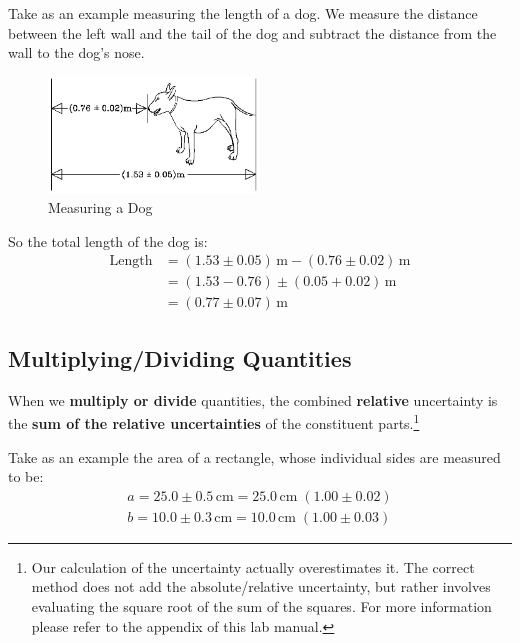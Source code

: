 \documentclass[letterpaper, 12pt]{book}
\begin{document}
Take as an example measuring the length of a dog. We measure the distance between the left wall and the tail of the dog and subtract the distance from the wall to the dog's nose.
\begin{figure}[h]
    \begin{center}
        \includegraphics[width=0.5\textwidth]{./pic/image2.png}
    \end{center}
    \caption{Measuring a Dog}
    \label{fig:dog}
\end{figure}
So the total length of the dog is:
\begin{equation}
    \begin{split}
        \text{Length} &= (1.53\pm 0.05)\,\mathrm{m} - (0.76 \pm 0.02)\,\mathrm{m} \\
        &= \left( 1.53 - 0.76 \right)\pm\left( 0.05 + 0.02 \right)\,\mathrm{m} \\
        &= \left( 0.77 \pm 0.07 \right)\,\mathrm{m}
    \end{split}
\end{equation}

\subsection{Multiplying/Dividing Quantities}

When we \textbf{multiply or divide} quantities, the combined \textbf{relative} uncertainty is the \textbf{sum of the relative uncertainties} of the constituent parts.\footnote{Our calculation of the uncertainty actually overestimates it. The correct method does not add the absolute/relative uncertainty, but rather involves evaluating the square root of the sum of the squares. For more information please refer to the appendix of this lab manual.}

Take as an example the area of a rectangle, whose individual sides are measured to be:
\begin{align}
    a = 25.0\pm 0.5\,\mathrm{cm} = 25.0\,\mathrm{cm}\;(1.00\pm 0.02) \nonumber \\
    b = 10.0\pm 0.3\,\mathrm{cm} = 10.0\,\mathrm{cm}\;(1.00\pm 0.03)
\end{align}
\end{document}
